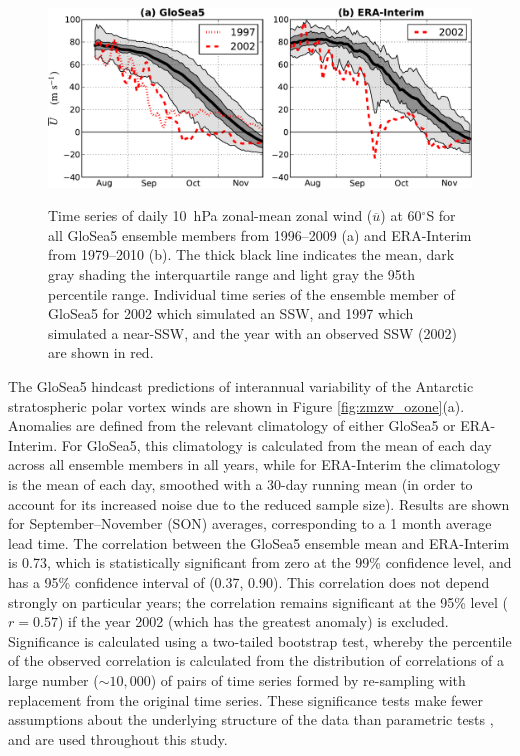 \begin{figure}[t]
  \noindent\includegraphics[width=\textwidth,angle=0]{figures/chapter-seasonal/zmzw_climatologies_crop.pdf}\\
  \caption[SH comparison of GloSea5 and ERA-Interim $\overline{u}$]{Time series of daily 10~hPa zonal-mean zonal wind
    ($\overline{u}$) at 60$^{\circ}$S for all GloSea5 ensemble members from
    1996--2009 (a) and ERA-Interim from 1979--2010 (b). The thick black line
    indicates the mean, dark gray shading the interquartile range and light gray
    the 95th percentile range. Individual time series of the ensemble member of
    GloSea5 for 2002 which simulated an SSW, and 1997 which simulated a
    near-SSW, and the year with an observed SSW (2002) are shown in
    red.}\label{fig:sh_zmzw_clim}
\end{figure}

The GloSea5 hindcast predictions of interannual variability of the Antarctic
stratospheric polar vortex winds are shown in Figure
\ref{fig:zmzw_ozone}(a). Anomalies are defined from the relevant climatology of
either GloSea5 or ERA-Interim. For GloSea5, this climatology is calculated from
the mean of each day across all ensemble members in all years, while for
ERA-Interim the climatology is the mean of each day, smoothed with a 30-day
running mean (in order to account for its increased noise due to the reduced
sample size). Results are shown for September--November (SON) averages,
corresponding to a 1 month average lead time. The correlation between the
GloSea5 ensemble mean and ERA-Interim is 0.73, which is statistically
significant from zero at the 99\% confidence level, and has a 95\% confidence
interval of (0.37, 0.90). This correlation does not depend strongly on particular
years; the correlation remains significant at the 95\% level ($r=0.57$) if the
year 2002 (which has the greatest anomaly) is excluded. Significance is
calculated using a two-tailed bootstrap test, whereby the percentile of the
observed correlation is calculated from the distribution of correlations of a
large number ($\sim 10,000$) of pairs of time series formed by re-sampling with
replacement from the original time series. These significance tests make fewer
assumptions about the underlying structure of the data than parametric tests
\citep{Wilks}, and are used throughout this study.


